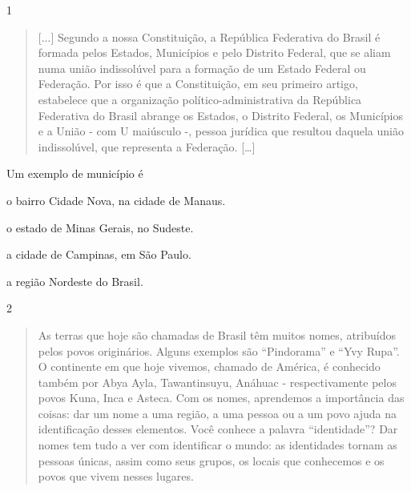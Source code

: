 \num{1}

\begin{quote}
{[}...{]} Segundo a nossa Constituição, a República Federativa do Brasil é
formada pelos Estados, Municípios e pelo Distrito Federal, que se aliam
numa união indissolúvel para a formação de um Estado Federal ou
Federação. Por isso é que a Constituição, em seu primeiro artigo,
estabelece que a organização político-administrativa da República
Federativa do Brasil abrange os Estados, o Distrito Federal, os
Municípios e a União - com U maiúsculo -, pessoa jurídica que resultou
daquela união indissolúvel, que representa a Federação. {[}\ldots{}{]}

\end{quote}

Um exemplo de município é

\begin{escolha}
\item o bairro Cidade Nova, na cidade de Manaus.

\item o estado de Minas Gerais, no Sudeste.

\item a cidade de Campinas, em São Paulo.

\item a região Nordeste do Brasil.
\end{escolha}


\num{2}

\begin{quote}
As terras que hoje são chamadas de Brasil têm muitos nomes, atribuídos pelos
povos originários. Alguns exemplos são “Pindorama” e “Yvy Rupa”. O continente em que hoje
vivemos, chamado de América, é conhecido também por Abya Ayla, Tawantinsuyu, Anáhuac - respectivamente pelos
povos Kuna, Inca e Asteca. Com os nomes, aprendemos a importância das
coisas: dar um nome a uma região, a uma pessoa ou a um povo ajuda na identificação desses elementos. Você conhece a palavra “identidade”?
Dar nomes tem tudo a ver com identificar o mundo: as
identidades tornam as pessoas únicas, assim como seus grupos, os locais que conhecemos e os povos que vivem nesses lugares.

\end{quote}

